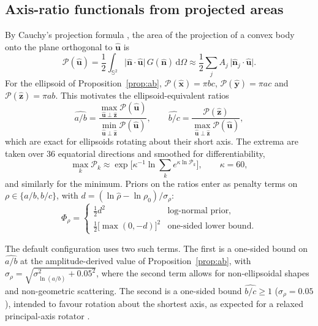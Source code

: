 \documentclass[11pt,a4paper]{article}
\theoremstyle{remark}
\newcommand{\uv}[1]{\hat{\bm{#1}}}
\newcommand{\Sph}{\mathbb{S}^2}
\newcommand{\dd}{\,\mathrm{d}}
\begin{document}
\subsection{Axis-ratio functionals from projected areas}
By Cauchy's projection formula \citep{schneider2014}, the area of the projection of a convex body onto
the plane orthogonal to $\uv u$ is
\begin{equation}
  \mathcal P(\uv u) = \frac12\int_{\Sph}\lvert\uv n\cdot\uv u\rvert\,G(\uv n)\dd\Omega
               \approx \frac12\sum_j A_j\,\lvert\uv n_j\cdot\uv u\rvert .
\end{equation}
For the ellipsoid of Proposition~\ref{prop:ab}, $\mathcal P(\uv x)=\pi bc$, $\mathcal P(\uv y)=\pi ac$
and $\mathcal P(\uv z)=\pi ab$. This motivates the ellipsoid-equivalent ratios
\begin{equation}
  \widehat{a/b}=\frac{\max_{\uv u\perp\uv z}\mathcal P(\uv u)}{\min_{\uv u\perp\uv z}\mathcal P(\uv u)},\qquad
  \widehat{b/c}=\frac{\mathcal P(\uv z)}{\max_{\uv u\perp\uv z}\mathcal P(\uv u)},
  \label{eq:ratios}
\end{equation}
which are exact for ellipsoids rotating about their short axis. The extrema are taken over 36
equatorial directions and smoothed for differentiability,
\begin{equation}
  \textstyle\max_k \mathcal P_k \approx \exp\bigl[\kappa^{-1}\ln\sum_k e^{\kappa\ln\mathcal P_k}\bigr],
  \qquad \kappa=60,
\end{equation}
and similarly for the minimum. Priors on the ratios enter as penalty terms on $\rho\in\{a/b,b/c\}$,
with $d=(\ln\hat\rho-\ln\rho_0)/\sigma_\rho$:
\begin{equation}
  \Phi_\rho=\begin{cases}\tfrac12 d^2 & \text{log-normal prior,}\\[2pt]
                         \tfrac12\bigl[\max(0,-d)\bigr]^2 & \text{one-sided lower bound.}\end{cases}
  \label{eq:ratiopen}
\end{equation}

The default configuration uses two such terms. The first is a one-sided bound on $\widehat{a/b}$ at the
amplitude-derived value of Proposition~\ref{prop:ab}, with
$\sigma_\rho=\sqrt{\sigma_{\ln(a/b)}^2+0.05^2}$, where the second term allows for non-ellipsoidal
shapes and non-geometric scattering. The second is a one-sided bound $\widehat{b/c}\ge1$
($\sigma_\rho=0.05$), intended to favour rotation about the shortest axis, as expected for a relaxed
principal-axis rotator \citep{burns1973}.
\end{document}
